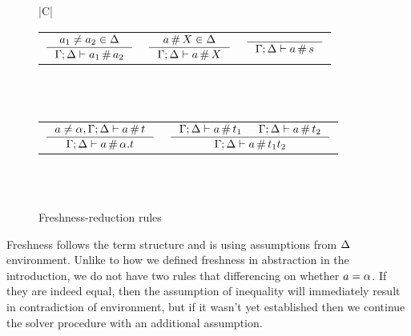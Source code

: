 \documentclass[english, mgr]{iithesis}
\newcommand{\solverRule}{\vdash}
\begin{document}
\begin{figure}[htbp]
    \centering
    \begin{tabularx}{\textwidth}{|C|}
      \hline \\
      \begin{tabular}{ccc}
      $
      \inference{
        \atomv_1 \cneq \atomv_2 \in \icEnv
      }{
        \cEnv ; \icEnv \solverRule \atomv_1 \cfresh \atomv_2
      }
      $ & $
      \inference{
        \atomv \cfresh \termv \in \icEnv
      }{
        \cEnv ; \icEnv \solverRule \atomv \cfresh \termv
      }
      $ & $
      \inference{
      }{
        \cEnv ; \icEnv \solverRule \atomv \cfresh \symb
      }
      $
      \end{tabular}
      \\ \\
      \begin{tabular}{cc}
      $
      \inference{
        \atomv \cneq \atomexp, \cEnv ; \icEnv \solverRule \atomv \cfresh \term
      }{
        \cEnv ; \icEnv \solverRule \atomv \cfresh \tbind{\atomexp}{\term}
      }
      $ &
      $
      \inference{
        \cEnv ; \icEnv \solverRule \atomv \cfresh \term_1
        &
        \cEnv ; \icEnv \solverRule \atomv \cfresh \term_2
      }{
        \cEnv ; \icEnv \solverRule \atomv \cfresh \term_1 \term_2
      }
      $
      \end{tabular}
      \\ \\ \hline
      \end{tabularx}
  \caption{Freshness-reduction rules}
  \label{fig:freshness-rules}
\end{figure}
Freshness follows the term structure and is using assumptions from $\Delta$ environment.
Unlike to how we defined freshness in abstraction in the introduction,
we do not have two rules that differencing on whether $a = \alpha$.
If they are indeed equal, then the assumption of inequality will immediately
result in contradiction of environment, but if it wasn't yet established
then we continue the solver procedure with an additional assumption.
\end{document}

